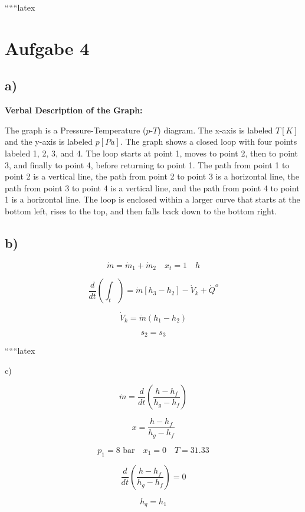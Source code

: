 
``````latex


\section*{Aufgabe 4}

\subsection*{a)}

\begin{center}
\textbf{Verbal Description of the Graph:}
\end{center}

The graph is a Pressure-Temperature ($p$-$T$) diagram. The x-axis is labeled $T [K]$ and the y-axis is labeled $p [Pa]$. The graph shows a closed loop with four points labeled 1, 2, 3, and 4. The loop starts at point 1, moves to point 2, then to point 3, and finally to point 4, before returning to point 1. The path from point 1 to point 2 is a vertical line, the path from point 2 to point 3 is a horizontal line, the path from point 3 to point 4 is a vertical line, and the path from point 4 to point 1 is a horizontal line. The loop is enclosed within a larger curve that starts at the bottom left, rises to the top, and then falls back down to the bottom right.

\subsection*{b)}

\[
\dot{m} = \dot{m}_1 + \dot{m}_2 \quad x_t = 1 \quad h
\]

\[
\frac{d}{dt} \left( \int_{t} \right) = \dot{m} \left[ h_3 - h_2 \right] - \dot{V}_k + \dot{Q}^o
\]

\[
\dot{V}_k = \dot{m} \left( h_1 - h_2 \right)
\]

\[
s_2 = s_3
\]

``````latex


c)

\[
\dot{m} = \frac{d}{dt} \left( \frac{h - h_f}{h_g - h_f} \right)
\]

\[
x = \frac{h - h_f}{h_g - h_f}
\]

\[
p_1 = 8 \text{ bar} \quad x_1 = 0 \quad T = 31.33
\]


\[
\frac{d}{dt} \left( \frac{h - h_f}{h_g - h_f} \right) = 0
\]

\[
h_{q} = h_{1}
\]

